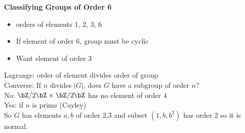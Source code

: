 \noindent 
\textbf{Classifying Groups of Order 6}
\begin{itemize}
    \item orders of elements 1, 2, 3, 6
    \item If element of order 6, group must be cyclic
    \item Want element of order 3
\end{itemize}
Lagrange: order of element divides order of group \\
Converse: If $n$ divides $|G|$, does $G$ have a subgroup of order $n$? \\
No: $\bZ/2\bZ \times \bZ/2\bZ$ has no element of order 4 \\
Yes: if $n$ is prime (Cayley) \\
So $G$ has elements $a,b$ of order 2,3 and subset $(1, b, b^2)$ has order 2 so it is normal. 